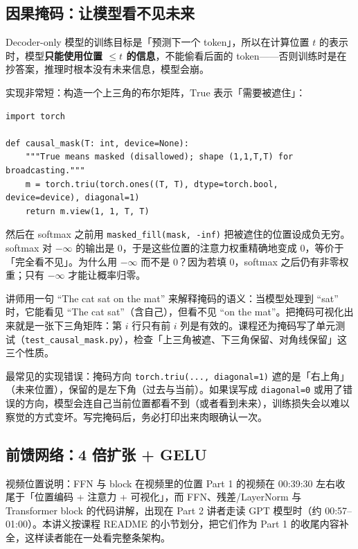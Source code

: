 \subsection{因果掩码：让模型看不见未来}

Decoder-only 模型的训练目标是「预测下一个 token」，所以在计算位置 $t$ 的表示时，模型\textbf{只能使用位置 $\le t$ 的信息}，不能偷看后面的 token——否则训练时是在抄答案，推理时根本没有未来信息，模型会崩。

实现非常短：构造一个上三角的布尔矩阵，$\text{True}$ 表示「需要被遮住」：

\begin{lstlisting}[caption={\texttt{part\_1/attn\_mask.py}：因果掩码}]
import torch

def causal_mask(T: int, device=None):
    """True means masked (disallowed); shape (1,1,T,T) for broadcasting."""
    m = torch.triu(torch.ones((T, T), dtype=torch.bool, device=device), diagonal=1)
    return m.view(1, 1, T, T)
\end{lstlisting}

然后在 softmax 之前用 \texttt{masked\_fill(mask, -inf)} 把被遮住的位置设成负无穷。softmax 对 $-\infty$ 的输出是 0，于是这些位置的注意力权重精确地变成 0，等价于「完全看不见」。为什么用 $-\infty$ 而不是 0？因为若填 0，softmax 之后仍有非零权重；只有 $-\infty$ 才能让概率归零。

讲师用一句 ``The cat sat on the mat'' 来解释掩码的语义：当模型处理到 ``sat'' 时，它能看见 ``The cat sat''（含自己），但看不见 ``on the mat''。把掩码可视化出来就是一张下三角矩阵：第 $i$ 行只有前 $i$ 列是有效的。课程还为掩码写了单元测试（\texttt{test\_causal\_mask.py}），检查「上三角被遮、下三角保留、对角线保留」这三个性质。

\begin{warningbox}{最常见的实现错误：掩码方向}
\texttt{torch.triu(..., diagonal=1)} 遮的是「右上角」（未来位置），保留的是左下角（过去与当前）。如果误写成 \texttt{diagonal=0} 或用了错误的方向，模型会连自己当前位置都看不到（或者看到未来），训练损失会以难以察觉的方式变坏。写完掩码后，务必打印出来肉眼确认一次。
\end{warningbox}

\subsection{前馈网络：4 倍扩张 + GELU}

\begin{knowledgebox}{视频位置说明：FFN 与 block 在视频里的位置}
Part 1 的视频在 00:39:30 左右收尾于「位置编码 + 注意力 + 可视化」，而 FFN、残差/LayerNorm 与 Transformer block 的代码讲解，出现在 Part 2 讲者走读 GPT 模型时（约 00:57--01:00）。本讲义按课程 README 的小节划分，把它们作为 Part 1 的收尾内容补全，这样读者能在一处看完整条架构。
\end{knowledgebox}

